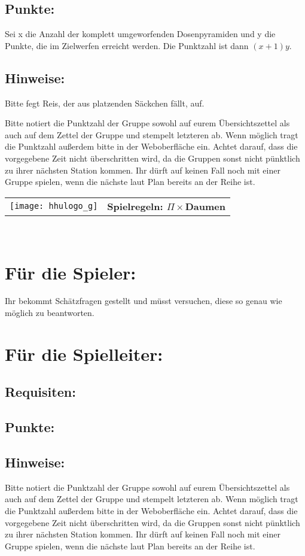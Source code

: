 \documentclass[a4paper,10pt]{article}
\def\spieli{$\Pi\times $Daumen}
\newcommand{\unten}{
 Bitte notiert die Punktzahl der Gruppe sowohl auf eurem Übersichtszettel als auch auf dem Zettel der Gruppe und stempelt letzteren ab. Wenn möglich tragt die Punktzahl außerdem bitte in der Weboberfläche ein.
 Achtet darauf, dass die vorgegebene Zeit nicht überschritten wird, da die Gruppen sonst nicht pünktlich zu ihrer nächsten Station kommen. Ihr dürft auf keinen Fall noch mit einer Gruppe spielen, wenn die nächste laut Plan bereits an der Reihe ist.
}
\begin{document}
\subsection*{Punkte:}
Sei x die Anzahl der komplett umgeworfenden Dosenpyramiden und y die Punkte, die im Zielwerfen erreicht werden. Die Punktzahl ist dann $(x+1)y$. 
\subsection*{Hinweise:}
Bitte fegt Reis, der aus platzenden Säckchen fällt, auf.
\unten

\newpage

  \begin{tabularx}{\textwidth}{lc}
    \texttt{[image: hhulogo\_g]}
  & {\Huge \textbf{Spielregeln: \spieli}}
  \end{tabularx}\\


\Large
\section*{Für die Spieler:}
Ihr bekommt Schätzfragen gestellt und müsst versuchen, diese so genau wie möglich
zu beantworten. 

\section*{Für die Spielleiter:}
\subsection*{Requisiten:} 
\subsection*{Punkte:}
\subsection*{Hinweise:}
\unten

\newpage
\end{document}

